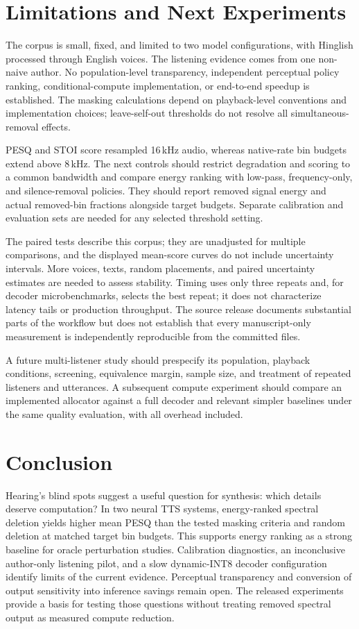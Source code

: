\documentclass[11pt,a4paper]{article}
\begin{document}
\section{Limitations and Next Experiments}
The corpus is small, fixed, and limited to two model configurations, with Hinglish processed through English voices. The listening evidence comes from one non-naive author. No population-level transparency, independent perceptual policy ranking, conditional-compute implementation, or end-to-end speedup is established. The masking calculations depend on playback-level conventions and implementation choices; leave-self-out thresholds do not resolve all simultaneous-removal effects.

PESQ and STOI score resampled 16\,kHz audio, whereas native-rate bin budgets extend above 8\,kHz. The next controls should restrict degradation and scoring to a common bandwidth and compare energy ranking with low-pass, frequency-only, and silence-removal policies. They should report removed signal energy and actual removed-bin fractions alongside target budgets. Separate calibration and evaluation sets are needed for any selected threshold setting.

The paired tests describe this corpus; they are unadjusted for multiple comparisons, and the displayed mean-score curves do not include uncertainty intervals. More voices, texts, random placements, and paired uncertainty estimates are needed to assess stability. Timing uses only three repeats and, for decoder microbenchmarks, selects the best repeat; it does not characterize latency tails or production throughput. The source release documents substantial parts of the workflow but does not establish that every manuscript-only measurement is independently reproducible from the committed files.

A future multi-listener study should prespecify its population, playback conditions, screening, equivalence margin, sample size, and treatment of repeated listeners and utterances. A subsequent compute experiment should compare an implemented allocator against a full decoder and relevant simpler baselines under the same quality evaluation, with all overhead included.

\section{Conclusion}
Hearing's blind spots suggest a useful question for synthesis: which details deserve computation? In two neural TTS systems, energy-ranked spectral deletion yields higher mean PESQ than the tested masking criteria and random deletion at matched target bin budgets. This supports energy ranking as a strong baseline for oracle perturbation studies. Calibration diagnostics, an inconclusive author-only listening pilot, and a slow dynamic-INT8 decoder configuration identify limits of the current evidence. Perceptual transparency and conversion of output sensitivity into inference savings remain open. The released experiments provide a basis for testing those questions without treating removed spectral output as measured compute reduction.
\end{document}
